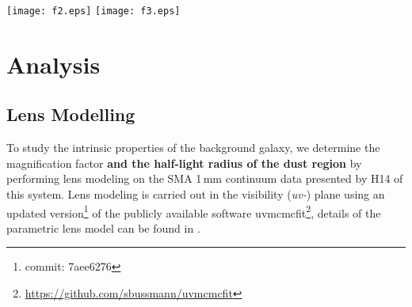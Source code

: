 \documentclass[iop, revtex4]{emulateapj}
\newcommand{\CO}{\mbox{CO($J$\,=\,3\,$\rightarrow$\,2) }}
\newcommand{\pmOne}{\mbox{$^{-1}$}}
\begin{document}
\begin{figure*}[tbph]
\centering
\texttt{[image: f2.eps]}
\texttt{[image: f3.eps]}
\caption{Top Left: Continuum-subtracted moment-0 map of \CO line emission toward
the background SMG with $\sigma$\,=\,1.03\,Jy\,\,km\,\,s\pmOne\ beam\pmOne\ over a velocity range of $\Delta v$\,$\sim$\,514\,km\,\,s\pmOne. The beam size is 11$\farcs$5\,$\times$\,6, at P.A.\,=\,$-$56\degr, as indicated in the bottom left corner.
Top Right: Velocity-integrated \CO line emission (red contours) overlaid on the SMA 1\,mm dust continuum (green contours and grayscale; H14), with an rms noise of $\sigma_\textrm{1\,mm}$\,=\,0.84 mJy beam\pmOne. The beam size of the SMA observations is 1$ \times $1, P.A. $-$34\degr, as shown
in the bottom left corner.
The central cross on each image corresponds to the same coordinates as in Figure~\ref{fig:cont}. The contour levels 
in both images
start at $\pm$3$\sigma$, incrementing at
steps of $\pm$1$\sigma$.
Bottom:
Spectrum extracted at the peak position of CO line emission, with a spectral resolution of $\Delta v$ $\sim$\,29 km\,\,s\pmOne, and an rms of $\sigma_\textrm{ch}$\,=\,9.5 mJy beam\pmOne\ per channel. The
solid black line shows a Gaussian fit to the \CO line profile, where the velocity scale is relative to $z$\,=\,2.221.
\label{fig:mom0}}
\end{figure*}


\section{Analysis}
\subsection{Lens Modelling} \label{sec:Lens}
To study the intrinsic properties of the background galaxy, we determine the magnification factor {\bf and the half-light radius of the dust region} by performing
lens modeling on the SMA 1\,mm continuum data presented by H14 of this system. Lens modeling is carried out in the visibility
({\it uv-}) plane using an updated version\footnote{commit: 7aee6276} of the publicly available software {\sc uvmcmcfit}\footnote{\url{https://github.com/sbussmann/uvmcmcfit}}, details of the parametric lens model can be found in \citet{Bussmann15a}. 
\end{document}
